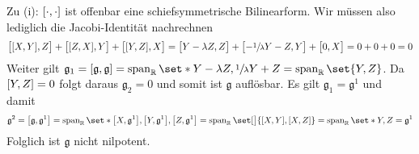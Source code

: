 \begin{beweis}
	Zu (i): $\benbrace*{\cdot,\cdot }$ ist offenbar eine schiefsymmetrische Bilinearform.
	Wir müssen also lediglich die Jacobi-Identität nachrechnen
	\[
		\benbrace[\big]{\benbrace*{X,Y},Z} + \benbrace[\big]{\benbrace*{Z,X},Y} + \benbrace[\big]{\benbrace*{Y,Z},X} = \benbrace[\big]{Y- \lambda Z,Z} + \benbrace[\big]{- \sfrac{1}{\lambda} Y - Z , Y} + \benbrace[\big]{0,X} 
		= 0 + 0 +0 = 0
	\]
	Weiter gilt $\mathfrak{g}_1 = \benbrace*{\mathfrak{g},\mathfrak{g}} = \Span_{\mathbb{R}}\set*{Y- \lambda Z,\sfrac{1}{\lambda}Y + Z} = \Span_{\mathbb{R}}\set{Y,Z}$.
	Da $\benbrace*{Y,Z}=0$ folgt daraus $\mathfrak{g}_2=0$ und somit ist $\mathfrak{g}$ auflösbar.
	Es gilt $\mathfrak{g}_1 = \mathfrak{g}^1$ und damit
	\begin{align}
		\mathfrak{g}^2 = \benbrace*{\mathfrak{g}, \mathfrak{g}^1} = \Span_{\mathbb{R}} \set*{\benbrace*{X,\mathfrak{g}^1}, \benbrace*{Y,\mathfrak{g}^1}, \benbrace*{Z,\mathfrak{g}^1}} = \Span_{\mathbb{R}} \set[\big]{\benbrace*{X,Y}, \benbrace*{X,Z}} = \Span_{\mathbb{R}} \set*{Y,Z} = \mathfrak{g}^1
	\end{align}
	Folglich ist $\mathfrak{g}$ nicht nilpotent.
	

\end{beweis}
